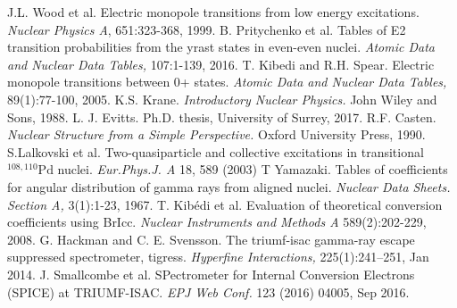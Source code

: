 \documentclass[twocolumn,preprintnumbers,amsmath,amssymb]{revtex4}
\begin{document}
\begin{thebibliography}{99}

 J.L. Wood et al. Electric monopole transitions from low energy excitations. \textit{Nuclear Physics A}, 651:323-368, 1999.
 B. Pritychenko et al. Tables of E2 transition probabilities from the yrast states in even-even nuclei. \textit{Atomic Data and Nuclear Data Tables,} 107:1-139, 2016.
 T. Kibedi and R.H. Spear. Electric monopole transitions between 0+ states. \textit{Atomic Data and Nuclear Data Tables,} 89(1):77-100, 2005.
 K.S. Krane. \textit{Introductory Nuclear Physics.} John Wiley and Sons, 1988.
 L. J. Evitts. Ph.D. thesis, University of Surrey, 2017.
 R.F. Casten. \textit{Nuclear Structure from a Simple Perspective.} Oxford University Press, 1990.
 S.Lalkovski et al. Two-quasiparticle and collective excitations in transitional $^{108,110}\mathrm{Pd}$ nuclei. \textit{Eur.Phys.J. A} 18, 589 (2003)
 T Yamazaki. Tables of coefficients for angular distribution of gamma rays from aligned nuclei. \textit{Nuclear Data Sheets. Section A,} 3(1):1-23, 1967.
 T. Kib\'edi et al. Evaluation of theoretical conversion coefficients using BrIcc. \textit{Nuclear Instruments and Methods A} 589(2):202-229, 2008.
 G. Hackman and C. E. Svensson. The triumf-isac gamma-ray escape suppressed spectrometer, tigress. \textit{Hyperfine Interactions,} 225(1):241–251, Jan 2014.
 J. Smallcombe et al. SPectrometer for Internal Conversion Electrons (SPICE) at TRIUMF-ISAC. 	
\textit{EPJ Web Conf.} 123 (2016) 04005, Sep 2016.

\end{thebibliography}
\end{document}
